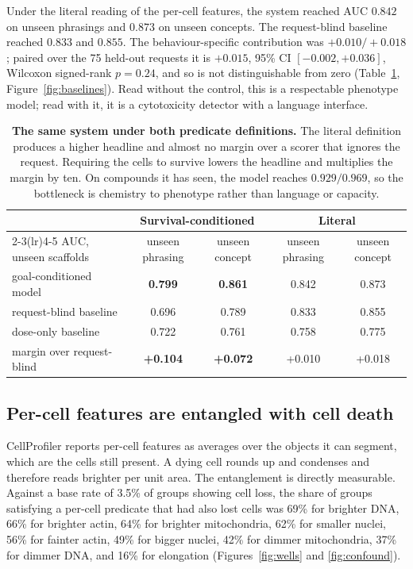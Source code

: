 \documentclass[11pt]{article}
\begin{document}
Under the literal reading of the per-cell features, the system reached AUC $0.842$ on
unseen phrasings and $0.873$ on unseen concepts. The request-blind baseline reached
$0.833$ and $0.855$. The behaviour-specific contribution was $+0.010/+0.018$;
paired over the 75 held-out requests it is $+0.015$, 95\% CI $[-0.002, +0.036]$, Wilcoxon
signed-rank $p = 0.24$, and so is not distinguishable from zero
(Table~\ref{tab:main}, Figure~\ref{fig:baselines}). Read without the control, this is a
respectable phenotype model; read with it, it is a cytotoxicity detector with a language
interface.

\begin{table}[t]
\centering
\small
\begin{tabular}{lcccc}
\toprule
 & \multicolumn{2}{c}{\textbf{Survival-conditioned}} & \multicolumn{2}{c}{Literal} \\
\cmidrule(lr){2-3}\cmidrule(lr){4-5}
AUC, unseen scaffolds & unseen phrasing & unseen concept & unseen phrasing & unseen concept \\
\midrule
goal-conditioned model   & \textbf{0.799} & \textbf{0.861} & 0.842 & 0.873 \\
request-blind baseline   & 0.696 & 0.789 & 0.833 & 0.855 \\
dose-only baseline       & 0.722 & 0.761 & 0.758 & 0.775 \\
\midrule
margin over request-blind & \textbf{+0.104} & \textbf{+0.072} & +0.010 & +0.018 \\
\bottomrule
\end{tabular}
\caption{\textbf{The same system under both predicate definitions.} The literal definition
produces a higher headline and almost no margin over a scorer that ignores the request.
Requiring the cells to survive lowers the headline and multiplies the margin by ten. On
compounds it has seen, the model reaches $0.929/0.969$, so the bottleneck is chemistry to
phenotype rather than language or capacity.}
\label{tab:main}
\end{table}

\subsection{Per-cell features are entangled with cell death}

CellProfiler \citep{carpenter2006cellprofiler} reports per-cell features as averages over
the objects it can segment, which are the cells still present. A dying cell rounds up and
condenses and therefore reads brighter per unit area. The entanglement is directly
measurable. Against a base rate of 3.5\% of groups showing cell loss, the share of groups
satisfying a per-cell predicate that had also lost cells was 69\% for brighter DNA, 66\%
for brighter actin, 64\% for brighter mitochondria, 62\% for smaller nuclei, 56\% for
fainter actin, 49\% for bigger nuclei, 42\% for dimmer mitochondria, 37\% for dimmer DNA,
and 16\% for elongation (Figures~\ref{fig:wells} and \ref{fig:confound}).
\end{document}

